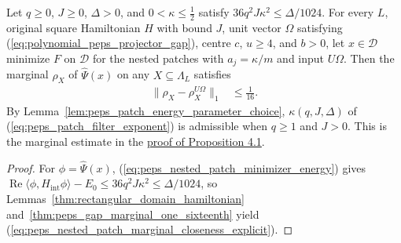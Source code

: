 \begin{lemma}
    \label{thm:peps_nested_patch_minimizer_marginal_closeness_explicit}
    \leanok
    Let $q\ge0$, $J\ge0$, $\Delta>0$, and $0<\kappa\le\tfrac12$ satisfy $36q^2J\kappa^2\le\Delta/1024$. For every $L$, original square Hamiltonian $H$ with bound $J$, unit vector $\Omega$ satisfying (\ref{eq:polynomial_peps_projector_gap}), centre $c$, $u\ge4$, and $b>0$, let $x\in\mathcal D$ minimize $F$ on $\mathcal D$ for the nested patches with $a_j=\kappa/m$ and input $U\Omega$. Then the marginal $\rho_X$ of $\widehat\Psi(x)$ on any $X\subseteq\Lambda_L$ satisfies
    \begin{align}
        \|\rho_X-\rho_X^{U\Omega}\|_1 & \le\frac1{16}.
        \label{eq:peps_nested_patch_marginal_closeness_explicit}
    \end{align}
    By Lemma~\ref{lem:peps_patch_energy_parameter_choice}, $\kappa(q,J,\Delta)$ of (\ref{eq:peps_patch_filter_exponent}) is admissible when $q\ge1$ and $J>0$. This is the marginal estimate in the
    \href{https://github.com/openai/math/blob/adc7f1241b42e322a6451854ab7e4b4c146bf78a/preprints/Polynomial-PEPS-approximation-of-gapped-square-grid-ground-states-September-24-2026/build/sections/03-patches.tex\#L338-L365}{proof of Proposition 4.1}.
\end{lemma}
\begin{proof}
    \leanok
    For $\phi=\widehat\Psi(x)$, (\ref{eq:peps_nested_patch_minimizer_energy}) gives
    $\operatorname{Re}\langle\phi,H_{\mathrm{int}}\phi\rangle-E_0\le 36q^2J\kappa^2\le\Delta/1024$, so Lemmas~\ref{thm:rectangular_domain_hamiltonian} and~\ref{thm:peps_gap_marginal_one_sixteenth} yield (\ref{eq:peps_nested_patch_marginal_closeness_explicit}).
\end{proof}

